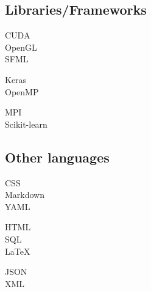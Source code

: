 \documentclass[curriculum-vitae-eng]{subfiles}
\begin{document}
		\subsection*{Libraries/Frameworks}
			\begin{minipage}[t]{.3\textwidth}
				CUDA \hfill {}\\
				OpenGL \hfill {}\\
				SFML \hfill {}\\
			\end{minipage}
			\hfill
			\begin{minipage}[t]{.3\textwidth}
				Keras \hfill {}\\
				OpenMP \hfill {}\\
			\end{minipage}
			\hfill
			\begin{minipage}[t]{.3\textwidth}
				MPI \hfill {}\\
				Scikit-learn \hfill {}\\
			\end{minipage}
		
		\subsection*{Other languages}
			\begin{minipage}[t]{.3\textwidth}
				CSS \hfill {}\\
				Markdown \hfill {}\\
				YAML \hfill {}\\
			\end{minipage}
			\hfill
			\begin{minipage}[t]{.3\textwidth}
				HTML \hfill {}\\
				SQL \hfill {}\\
				\LaTeX \hfill {}\\
			\end{minipage}
			\hfill
			\begin{minipage}[t]{.3\textwidth}
				JSON \hfill {}\\
				XML \hfill {}\\
			\end{minipage}
		
\end{document}
